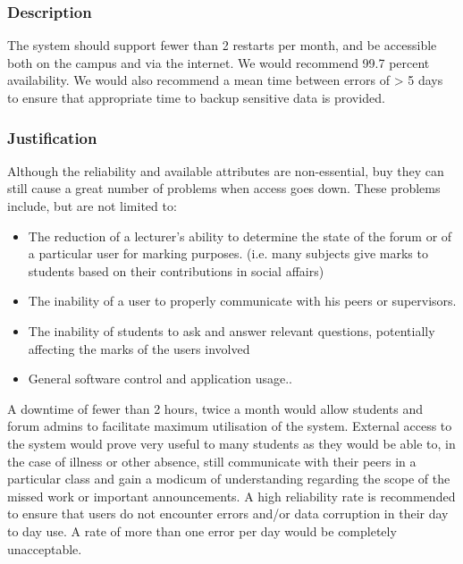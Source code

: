 
	\subsubsection*{Description}
		The system should support fewer than 2 restarts per month, and be accessible both on the campus and via the internet. We would recommend 99.7 percent availability. We would also recommend a mean time between errors of > 5 days to ensure that appropriate time to backup sensitive data is provided.
		
		
	\subsubsection*{Justification}
	Although the reliability and available attributes are non-essential, buy they can still cause a great number of problems when access goes down. These problems include, but are not limited to: 
	
				
					\begin{itemize}
							\item The reduction of a lecturer’s ability to determine the state of the forum or of a particular user for marking purposes. (i.e. many subjects give marks to students based on their contributions in social affairs)
							
							\item The inability of a user to properly communicate with his peers or supervisors.
							
							\item The inability of students to ask and answer relevant questions, potentially affecting the marks of the users involved
							
							\item General software control and application usage..
						 \end{itemize}
						 
	A downtime of fewer than 2 hours, twice a month would allow students and forum admins to facilitate maximum utilisation of the system.
	External access to the system would prove very useful to many students as they would be able to, in the case of illness or other absence, still communicate with their peers in a particular class and gain a modicum of understanding regarding the scope of the missed work or important announcements.
	A high reliability rate is recommended to ensure that users do not encounter errors and/or data corruption in their day to day use. A rate of more than one error per day would be completely unacceptable.
		
